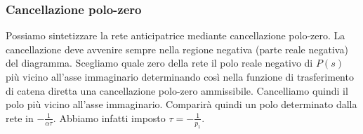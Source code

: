 \documentclass[11pt]{article}
\begin{document}
\subsubsection{Cancellazione polo-zero}
Possiamo sintetizzare la rete anticipatrice mediante cancellazione polo-zero. La cancellazione deve avvenire sempre nella regione negativa (parte reale negativa) del diagramma. Scegliamo quale zero della rete il polo reale negativo di $P(s)$ più vicino all'asse immaginario determinando così nella funzione di trasferimento di catena diretta una cancellazione polo-zero ammissibile. Cancelliamo quindi il polo più vicino all'asse immaginario. Comparirà quindi un polo determinato dalla rete in $-\frac{1}{\alpha\tau}$. Abbiamo infatti imposto $\tau=-\frac{1}{p_1}$.
\end{document}

